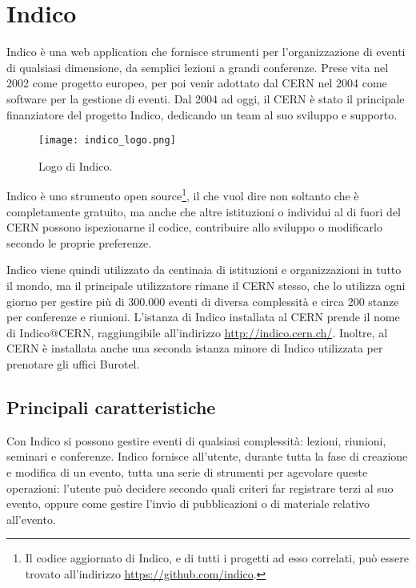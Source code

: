 \chapter{Indico} \label{chap:indico}
	
	Indico è una web application che fornisce strumenti per l'organizzazione di eventi di qualsiasi dimensione, da semplici lezioni a grandi conferenze. Prese vita nel 2002 come progetto europeo, per poi venir adottato dal \ac{CERN} nel 2004 come software per la gestione di eventi. Dal 2004 ad oggi, il \ac{CERN} è stato il principale finanziatore del progetto Indico, dedicando un team al suo sviluppo e supporto.
	
	\begin{figure}[h!]
		\begin{center}
			\texttt{[image: indico\_logo.png]}
		\end{center}
		\caption[Logo di Indico]{Logo di Indico.}
		\label{fig:indico_logo}
	\end{figure}
	
	Indico è uno strumento open source\footnote{Il codice aggiornato di Indico, e di tutti i progetti ad esso correlati, può essere trovato all'indirizzo \url{https://github.com/indico}.}, il che vuol dire non soltanto che è completamente gratuito, ma anche che altre istituzioni o individui al di fuori del \ac{CERN} possono ispezionarne il codice, contribuire allo sviluppo o modificarlo secondo le proprie preferenze.
	
	Indico viene quindi utilizzato da centinaia di istituzioni e organizzazioni in tutto il mondo, ma il principale utilizzatore rimane il \ac{CERN} stesso, che lo utilizza ogni giorno per gestire più di 300.000 eventi di diversa complessità e circa 200 stanze per conferenze e riunioni. L'istanza di Indico installata al \ac{CERN} prende il nome di Indico@CERN, raggiungibile all'indirizzo \url{http://indico.cern.ch/}. Inoltre, al \ac{CERN} è installata anche una seconda istanza minore di Indico utilizzata per prenotare gli uffici Burotel.
	
	\section{Principali caratteristiche} \label{sec:i;caratteristiche}
	
		Con Indico si possono gestire eventi di qualsiasi complessità: lezioni, riunioni, seminari e conferenze. Indico fornisce all'utente, durante tutta la fase di creazione e modifica di un evento, tutta una serie di strumenti per agevolare queste operazioni: l'utente può decidere secondo quali criteri far registrare terzi al suo evento, oppure come gestire l'invio di pubblicazioni o di materiale relativo all'evento.
		
